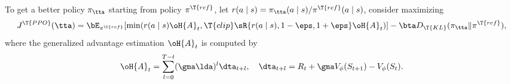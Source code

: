 \documentclass[article, a4paper, twoside]{universal}
\begin{document}

To get a better policy $\pi_{\tta}$ starting from policy $\pi^{\T{ref}}$, let $r(a\mid s)=\pi_{\tta}(a\mid s)/\pi^{\T{ref}}(a\mid s)$, consider maximizing
\[
    J^{\T{PPO}}(\tta)=\bE_{\pi^{\T{ref}}}[\min(r(a\mid s)\oH{A}_{t},\T{clip}\sR{r(a\mid s), 1-\eps, 1+\eps}\oH{A}_{t})]-\bta D_{\T{KL}}(\pi_{\tta}\|\pi^{\T{ref}}),
\]
where the generalized advantage estimation $\oH{A}_{t}$ is computed by
\[
    \oH{A}_{t}=\sum_{l=0}^{T-t}(\gma\lda)^{l}\dta_{t+l},\quad \dta_{t+l}=R_{t}+\gma V_{\phi}(S_{t+1})-V_{\phi}(S_{t}).
\]





%
%
%



\printref
\end{document}
